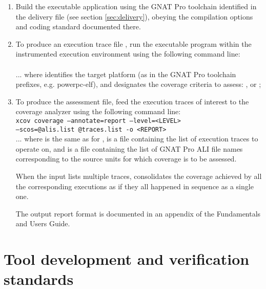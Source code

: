 \documentclass {report}
\begin{document}
\begin{enumerate}
\item Build the executable application using the GNAT Pro toolchain identified
  in the delivery file (see section \ref{sec:delivery}), obeying the
  compilation options and coding standard documented there.

\item To produce an execution trace file , run the 
  executable program within the instrumented execution environment using the
  following command line:\\

 \\

... where  identifies the target platform (as in the GNAT Pro
toolchain prefixes, e.g.  powerpc-elf), and  designates the
coverage criteria to assess: ,  or ;

\item To produce the assessment  file, feed the execution traces
  of interest to the coverage analyzer using the following command line:\\

\texttt{xcov coverage --annotate=report --level=<LEVEL> \\
  --scos=@alis.list @traces.list -o <REPORT>} \\

... where  is the same as for ,  is a
file containing the list of execution traces to operate on, and 
is a file containing the list of GNAT Pro ALI file names corresponding to the
source units for which coverage is to be assessed.

When the  input lists multiple traces, \xcov{} consolidates the
coverage achieved by all the corresponding executions as if they all happened
in sequence as a single one.

The output report format is documented in an appendix of the \xcov{}
Fundamentals and Users Guide.

\end{enumerate}


\chapter{Tool development and verification standards}
\end{document}
